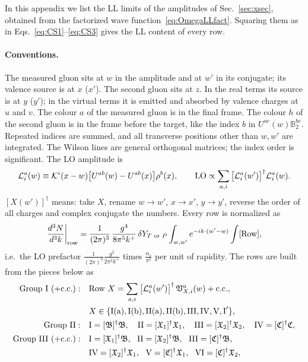 \documentclass[aps,prd,onecolumn,superscriptaddress,nofootinbib,floatfix,longbibliography,11pt]{revtex4-2}
\numberwithin{equation}{section}
\newcommand{\KK}{\mathcal{K}}
\def\mf#1{\mathbb{#1}}
\begin{document}
In this appendix we list the LL limits of the amplitudes of Sec.~\ref{sec:xsec}, obtained from the factorized wave function~\eqref{eq:OmegaLLfact}. Squaring them as in Eqs.~\eqref{eq:CS1}--\eqref{eq:CS3} gives the LL content of every row.

\paragraph*{Conventions.} The measured gluon sits at $w$ in the amplitude and at $w'$ in its conjugate; its valence source is at $x$ ($x'$). The second gluon sits at $z$. In the real terms its source is at $y$ ($y'$); in the virtual terms it is emitted and absorbed by valence charges at $u$ and $v$. The colour $a$ of the measured gluon is in the final frame. The colour $h$ of the second gluon is in the frame before the target, like the index $b$ in $U^{ac}(w)\mf B_2^{bc}$. Repeated indices are summed, and all transverse positions other than $w,w'$ are integrated. The Wilson lines are general orthogonal matrices; the index order is significant. The LO amplitude is
\begin{equation}
\mathcal L^a_i(w)\equiv\KK^i(x-w)\big[U^{ab}(w)-U^{ab}(x)\big]\rho^b(x),\qquad {\rm LO}\propto\sum_{a,i}\big[\mathcal L^a_i(w')\big]^\dagger\mathcal L^a_i(w).
\end{equation}
$[X(w')]^\dagger$ means: take $X$, rename $w\to w'$, $x\to x'$, $y\to y'$, reverse the order of all charges and complex conjugate the numbers. Every row is normalized as
\begin{equation}
\frac{d^3N}{d^3k}\bigg|_{\rm row}=\frac{1}{(2\pi)^3}\,\frac{g^4}{8\pi^5k^+}\,\delta Y_{T\text{ or }P}\int_{w,w'}e^{-ik\cdot(w'-w)}\int[\text{Row}],
\label{eq:LLnorm}
\end{equation}
i.e.\ the LO prefactor $\frac{1}{(2\pi)^3}\frac{g^2}{2\pi^2k^+}$ times $\frac{\alpha_s}{\pi^2}$ per unit of rapidity. The rows are built from the pieces below as
\begin{align}
\text{Group I }(+{\rm c.c.}):&\quad \text{Row }X=\sum_{a,i}\big[\mathcal L^a_i(w')\big]^\dagger\,\mathfrak V^a_{X,i}(w)+{\rm c.c.},\notag\\
&\quad X\in\{{\rm I(a),I(b),II(a),II(b),III,IV,V,I}'\},\notag\\
\text{Group II}:&\quad \text{I}=[\mathfrak B]^\dagger\mathfrak B,\quad \text{II}=[\mathfrak X_1]^\dagger\mathfrak X_1,\quad \text{III}=[\mathfrak X_2]^\dagger\mathfrak X_2,\quad \text{IV}=[\mathfrak C]^\dagger\mathfrak C,\notag\\
\text{Group III }(+{\rm c.c.}):&\quad \text{I}=[\mathfrak X_1]^\dagger\mathfrak B,\ \ \text{II}=[\mathfrak X_2]^\dagger\mathfrak B,\ \ \text{III}=[\mathfrak C]^\dagger\mathfrak B,\notag\\
&\quad\text{IV}=[\mathfrak X_2]^\dagger\mathfrak X_1,\ \ \text{V}=[\mathfrak C]^\dagger\mathfrak X_1,\ \ \text{VI}=[\mathfrak C]^\dagger\mathfrak X_2,
\end{align}
\end{document}
